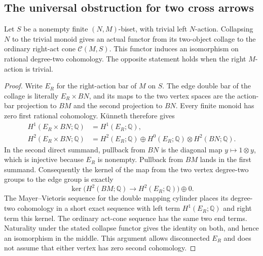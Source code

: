 \subsection{The universal obstruction for two cross arrows}

\begin{lemma}
\label{C:trivial-biset-side-H2}
Let $S$ be a nonempty finite $(N,M)$-biset, with trivial left
$N$-action.  Collapsing $N$ to the trivial monoid gives an actual
functor from its two-object collage to the ordinary right-act cone
$\mathcal C(M,S)$.  This functor induces an isomorphism on rational
degree-two cohomology.  The opposite statement holds when the right
$M$-action is trivial.
\end{lemma}
\begin{proof}
Write $E_R$ for the right-action bar of $M$ on $S$.  The edge
double bar of the collage is literally $E_R\times BN$, and its
maps to the two vertex spaces are the action-bar projection to
$BM$ and the second projection to $BN$.
Every finite monoid has zero first rational cohomology.  K\"unneth
therefore gives
\[
 \begin{aligned}
 H^1(E_R\times BN;\mathbb Q)&=H^1(E_R;\mathbb Q),\\
 H^2(E_R\times BN;\mathbb Q)&=H^2(E_R;\mathbb Q)
 \oplus H^0(E_R;\mathbb Q)\otimes H^2(BN;\mathbb Q).
 \end{aligned}
\]
In the second direct summand, pullback from $BN$ is the diagonal
map $y\mapsto 1\otimes y$, which is injective because $E_R$ is
nonempty.  Pullback from $BM$ lands in the first summand.
Consequently the kernel of the map from the two vertex
degree-two groups to the edge group is exactly
\[
 \ker\bigl(H^2(BM;\mathbb Q)\longrightarrow
                 H^2(E_R;\mathbb Q)\bigr)\oplus0.
\]
The Mayer--Vietoris sequence for the double mapping cylinder
places its degree-two cohomology in a short exact sequence with
left term $H^1(E_R;\mathbb Q)$ and right term this kernel.
The ordinary act-cone sequence has the same two end terms.
Naturality under the stated collapse functor gives the identity
on both, and hence an isomorphism in the middle.  This argument
allows disconnected $E_R$ and does not assume that either vertex
has zero second cohomology.
\end{proof}

